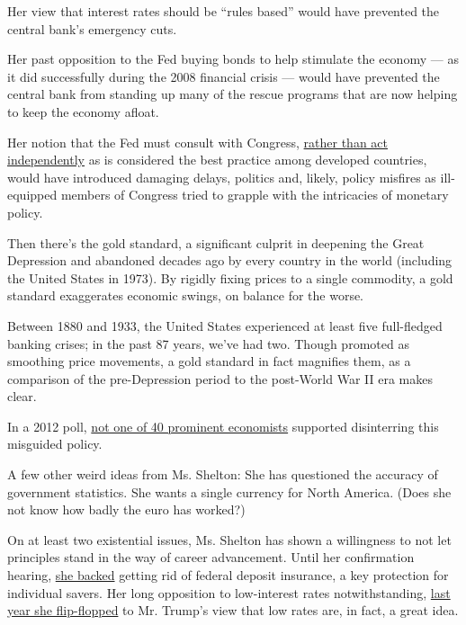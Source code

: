 Her view that interest rates should be ``rules based'' would have
prevented the central bank's emergency cuts.

Her past opposition to the Fed buying bonds to help stimulate the
economy --- as it did successfully during the 2008 financial crisis ---
would have prevented the central bank from standing up many of the
rescue programs that are now helping to keep the economy afloat.

Her notion that the Fed must consult with Congress,
\href{https://www.washingtonpost.com/business/2019/11/21/trumps-fed-nominee-judy-shelton-recently-questioned-need-an-independent-central-bank/}{rather
than act independently} as is considered the best practice among
developed countries, would have introduced damaging delays, politics
and, likely, policy misfires as ill-equipped members of Congress tried
to grapple with the intricacies of monetary policy.

Then there's the gold standard, a significant culprit in deepening the
Great Depression and abandoned decades ago by every country in the world
(including the United States in 1973). By rigidly fixing prices to a
single commodity, a gold standard exaggerates economic swings, on
balance for the worse.

Between 1880 and 1933, the United States experienced at least five
full-fledged banking crises; in the past 87 years, we've had two. Though
promoted as smoothing price movements, a gold standard in fact magnifies
them, as a comparison of the pre-Depression period to the post-World War
II era makes clear.

In a 2012 poll,
\href{http://www.igmchicago.org/surveys/gold-standard/}{not one of 40
prominent economists} supported disinterring this misguided policy.

A few other weird ideas from Ms. Shelton: She has questioned the
accuracy of government statistics. She wants a single currency for North
America. (Does she not know how badly the euro has worked?)

On at least two existential issues, Ms. Shelton has shown a willingness
to not let principles stand in the way of career advancement. Until her
confirmation hearing,
\href{https://www.washingtonpost.com/business/2020/02/13/trumps-fed-nominee-judy-shelton-could-be-trouble-key-gop-senators-express-concerns-about-her-outlier-views/}{she
backed} getting rid of federal deposit insurance, a key protection for
individual savers. Her long opposition to low-interest rates
notwithstanding,
\href{https://www.washingtonpost.com/business/2019/06/19/fed-meets-trumps-potential-next-pick-wants-see-lower-rates-fast-possible/}{last
year she flip-flopped} to Mr. Trump's view that low rates are, in fact,
a great idea.

